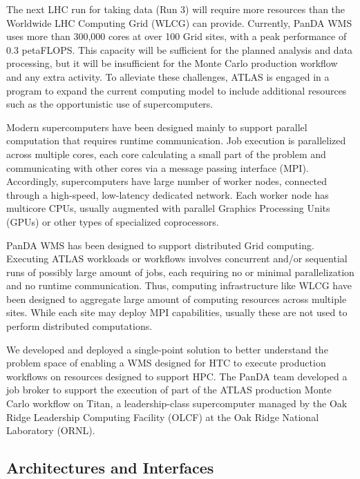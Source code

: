 The next LHC run for taking data (Run 3) will require more resources than the
Worldwide LHC Computing Grid (WLCG) can provide. Currently, PanDA WMS uses more
than 300,000 cores at over 100 Grid sites, with a peak performance of 0.3
petaFLOPS. This capacity will be sufficient for the planned analysis and data
processing, but it will be insufficient for the Monte Carlo production workflow
and any extra activity. To alleviate these challenges, ATLAS is engaged in a
program to expand the current computing model to include additional resources
such as the opportunistic use of supercomputers.

Modern supercomputers have been designed mainly to support parallel computation
that requires runtime communication. Job execution is parallelized across
multiple cores, each core calculating a small part of the problem and
communicating with other cores via a message passing interface (MPI).
Accordingly, supercomputers have large number of worker nodes, connected through
a high-speed, low-latency dedicated network. Each worker node has multicore
CPUs, usually augmented with parallel Graphics Processing Units (GPUs) or other
types of specialized coprocessors.

PanDA WMS has been designed to support distributed Grid computing. Executing
ATLAS workloads or workflows involves concurrent and/or sequential runs of
possibly large amount of jobs, each requiring no or minimal parallelization and
no runtime communication. Thus, computing infrastructure like WLCG have been
designed to aggregate large amount of computing resources across multiple sites.
While each site may deploy MPI capabilities, usually these are not used to
perform distributed computations.

We developed and deployed a single-point solution to better understand the
problem space of enabling a WMS designed for HTC to execute production workflows
on resources designed to support HPC. The PanDA team developed a job broker to
support the execution of part of the ATLAS production Monte Carlo workflow on
Titan, a leadership-class supercomputer managed by the Oak Ridge Leadership
Computing Facility (OLCF) at the Oak Ridge National Laboratory (ORNL).


\subsection{Architectures and Interfaces}
\label{ssec:panda-titan}

